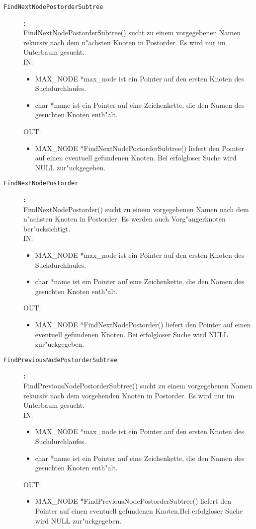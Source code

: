 \begin{description}
\item[\tt FindNextNodePostorderSubtree]{\bf :\\}
FindNextNodePostorderSubtree() sucht zu einem vorgegebenen Namen rekursiv nach dem n"achsten Knoten in Postorder. Es wird nur im Unterbaum gesucht. \\
IN:
\begin{itemize}
   \item MAX\_NODE *max\_node ist ein Pointer auf den ersten Knoten des Suchdurchlaufes.
   \item char *name ist ein Pointer auf eine Zeichenkette, die den Namen des gesuchten Knoten enth"alt.
\end{itemize}
OUT:
\begin{itemize}
   \item MAX\_NODE *FindNextNodePostorderSubtree() liefert den Pointer auf einen eventuell gefundenen Knoten. Bei erfolgloser Suche wird NULL zur"uckgegeben.
\end{itemize}

\item[\tt FindNextNodePostorder]{\bf :\\}
FindNextNodePostorder() sucht zu einem vorgegebenen Namen nach dem n"achsten Knoten in Postorder. Es werden auch Vorg"angerknoten ber"ucksichtigt. \\
IN:
\begin{itemize}
   \item MAX\_NODE *max\_node ist ein Pointer auf den ersten Knoten des Suchdurchlaufes.
   \item char *name ist ein Pointer auf eine Zeichenkette, die den Namen des gesuchten Knoten enth"alt.
\end{itemize}
OUT:
\begin{itemize}
   \item MAX\_NODE *FindNextNodePostorder() liefert den Pointer auf einen eventuell gefundenen Knoten. Bei erfolgloser Suche wird NULL zur"uckgegeben.
\end{itemize}

\item[\tt FindPreviousNodePostorderSubtree]{\bf :\\}
FindPreviousNodePostorderSubtree() sucht zu einem vorgegebenen Namen rekursiv nach dem vorgehenden Knoten in Postorder. Es wird nur im Unterbaum gesucht. \\
IN:
\begin{itemize}
   \item MAX\_NODE *max\_node ist ein Pointer auf den ersten Knoten des Suchdurchlaufes.
   \item char *name ist ein Pointer auf eine Zeichenkette, die den Namen des gesuchten Knoten enth"alt.
\end{itemize}
OUT:
\begin{itemize}
   \item MAX\_NODE *FindPreviousNodePostorderSubtree() liefert den Pointer auf einen eventuell gefundenen Knoten.Bei erfolgloser Suche wird NULL zur"uckgegeben.
\end{itemize}


\end{description}

